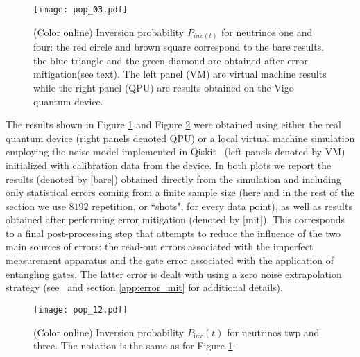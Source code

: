 \documentclass[Dual]{msu-thesis}
\begin{document}
\begin{figure}[t]
 \centering
 \texttt{[image: pop\_03.pdf]}
 \caption{(Color online) Inversion probability $P_{inv(t)}$ for neutrinos one and four: the red circle and brown square correspond to the bare results, the blue triangle and the green diamond are obtained after error mitigation(see text). The left panel (VM) are virtual machine results while the right panel (QPU) are results obtained on the Vigo~\cite{IBMQ_Vigo} quantum device.}
\label{fig:pop_03}
\end{figure}

The results shown in Figure \ref{fig:pop_03} and Figure \ref{fig:pop_12} were obtained using either the real quantum device (right panels denoted QPU) or a local virtual machine simulation employing the noise model implemented in Qiskit~\cite{qiskit} (left panels denoted by VM) initialized with calibration data from the device. In both plots we report the results (denoted by [bare]) obtained directly from the simulation and including only statistical errors coming from a finite sample size (here and in the rest of the section we use $8192$ repetition, or ``shots", for every data point), as well as results obtained after performing error mitigation (denoted by [mit]). This corresponds to a final post-processing step that attempts to reduce the influence of the two main sources of errors: the read-out errors associated with the imperfect measurement apparatus and the gate error associated with the application of entangling gates. The latter error is dealt with using a zero noise extrapolation strategy (see~\cite{Endo2018,Dumitrescu2018} and section \ref{app:error_mit} for additional details). %

\begin{figure}[t]
 \centering
 \texttt{[image: pop\_12.pdf]}
 \caption{(Color online) Inversion probability $P_{\text{inv}}(t)$ for neutrinos twp and three. The notation is the same as for Figure \ref{fig:pop_03}.}
\label{fig:pop_12}
\end{figure}
 
\end{document}
